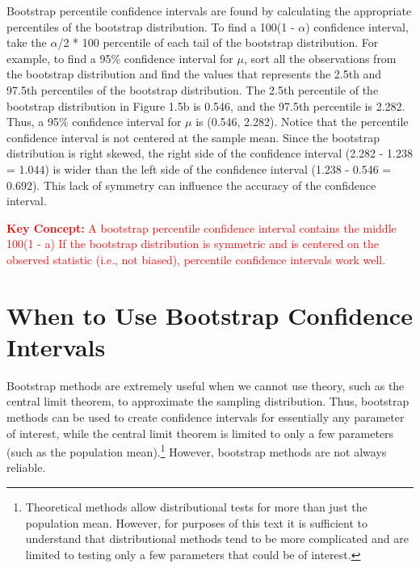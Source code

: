 \documentclass[
]{report}
\begin{document}
Bootstrap percentile confidence intervals are found by calculating the appropriate percentiles of the bootstrap distribution. To find a 100(1 - \(\alpha\)) confidence interval, take the \(\alpha\)/2 * 100 percentile of each tail of the bootstrap distribution. For example, to find a 95\% confidence interval for \(\mu\), sort all the observations from the bootstrap distribution and find the values that represents the 2.5th and 97.5th percentiles of the bootstrap distribution. The
2.5th percentile of the bootstrap distribution in Figure 1.5b is 0.546, and the 97.5th percentile is 2.282. Thus,
a 95\% confidence interval for \(\mu\) is (0.546, 2.282).
Notice that the percentile confidence interval is not centered at the sample mean. Since the bootstrap
distribution is right skewed, the right side of the confidence interval (2.282 - 1.238 = 1.044) is wider than
the left side of the confidence interval (1.238 - 0.546 = 0.692). This lack of symmetry can influence the
accuracy of the confidence interval.

\Large

\textbf{\textcolor{red}{Key Concept:}}
\textcolor{red}{A bootstrap percentile confidence interval contains the middle 100(1 - a)%
If the bootstrap distribution is symmetric and is centered on the observed statistic (i.e., not biased),
percentile confidence intervals work well.}

\normalsize

\section*{When to Use Bootstrap Confidence Intervals}\label{when-to-use-bootstrap-confidence-intervals}

Bootstrap methods are extremely useful when we cannot use theory, such as the central limit theorem, to
approximate the sampling distribution. Thus, bootstrap methods can be used to create confidence intervals
for essentially any parameter of interest, while the central limit theorem is limited to only a few parameters
(such as the population mean).\footnote{Theoretical methods allow distributional tests for more than just the population mean. However, for purposes of this text it is sufficient to understand that distributional methods tend to be more complicated and are limited to testing only a few
  parameters that could be of interest.} However, bootstrap methods are not always reliable.
\end{document}
